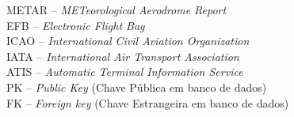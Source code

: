 \noindent \doublespacing
METAR -- \textit{METeorological Aerodrome Report}\\
EFB -- \textit{Electronic Flight Bag}\\
ICAO -- \textit{International Civil Aviation Organization}\\
IATA -- \textit{International Air Transport Association}\\
ATIS -- \textit{Automatic Terminal Information Service}\\
PK -- \textit{Public Key} (Chave Pública em banco de dados)\\
FK -- \textit{Foreign key} (Chave Estrangeira em banco de dados)\\

